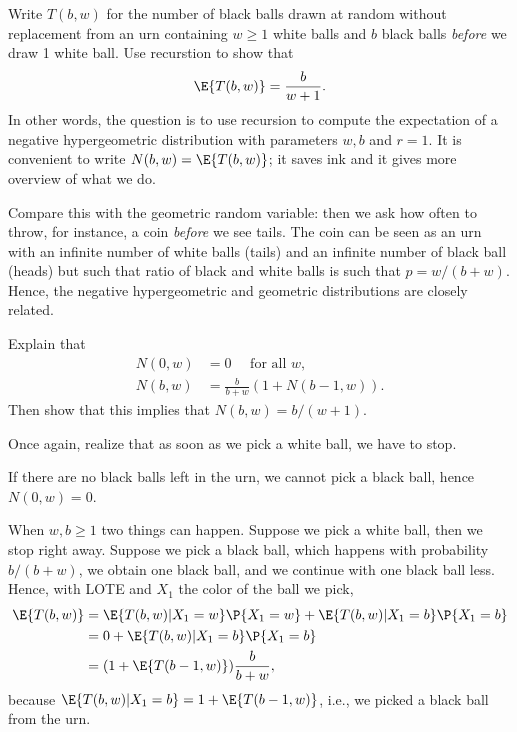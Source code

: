\begin{exercise}
Write $T(b,w)$ for the number of black balls drawn at random without replacement from an urn containing $w\geq 1$ white balls and $b$ black balls \emph{before} we draw 1 white ball. Use recurstion to show that
\begin{align}
  \label{eq:727}
\E{T(b,w)} = \frac{b}{w+1}.
\end{align}
In other words, the question is to use recursion to compute  the expectation of a negative hypergeometric distribution with parameters $w,b$ and $r=1$.
It is convenient to write $N(b,w) = \E{T(b,w)}$; it saves ink and it gives more overview of what we do.

Compare this with the geometric random variable: then we ask how often to throw, for instance, a coin \emph{before} we see tails.
The coin can be seen as an urn with an infinite number of white balls (tails) and an infinite number of black ball (heads) but such that ratio of black and white balls is such that $p=w/(b+w)$.
Hence, the negative hypergeometric and geometric distributions are closely related.

\begin{hint}
Explain that
\begin{align}
N(0, w) &= 0\quad \text{ for all $w$},\\
  N(b,w) &= \frac{b}{b+w} (1+N(b-1, w)).
\end{align}
Then show that this implies that $N(b,w) = b/ (w+1)$.
\end{hint}
\begin{solution}
Once again, realize that as soon as we pick a white ball, we have to stop.

If there are no black balls left in the urn,  we cannot pick a black ball, hence $N(0,w) = 0$.

When $w, b \geq 1$ two things can happen.
Suppose we pick a white ball, then we stop right away.
Suppose we pick a black ball, which happens with probability $b/(b+w)$, we obtain one black ball, and we continue with one black ball less.
Hence, with LOTE and $X_{1}$ the color of the ball we pick,
\begin{align}
\E{T(b,w)}
  &= \E{T(b,w) | X_1 = w} \P{X_1=w} + \E{T(b,w)|X_1=b} \P{X_1=b}   \\
  &= 0 + \E{T(b,w)|X_1=b} \P{X_1=b} \\
  &= (1+\E{T(b-1, w)}) \frac{b}{b+w},
\end{align}
because $\E{T(b, w) |X_1=b} = 1 + \E{T(b-1,w)}$, i.e., we picked a black ball from the urn.


\end{solution}
\end{exercise}

